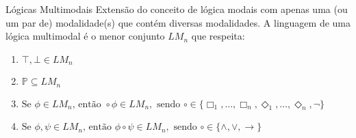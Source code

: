 \begin{frame}{Lógicas Multimodais}
    Extensão do conceito de lógica modais com apenas uma (ou um par de) modalidade(s) que contém diversas modalidades.
    A linguagem de uma lógica multimodal é o menor conjunto \(LM_n\) que respeita:

    \vspace{\baselineskip}

    \begin{enumerate}
        \item \(\top, \bot \in LM_n \)
        \item \(\mathbb{P} \subseteq LM_n\)
        \item \(\text{Se } \phi \in LM_n \text{, então } \circ \phi \in LM_n, \text{ sendo } \circ \in \{\Box_1, \dots, \Box_n, \Diamond_1, \dots, \Diamond_n, \neg\}\)
        \item \(\text{Se } \phi, \psi \in LM_n \text{, então } \phi \circ \psi \in LM_n, \text{ sendo } \circ \in \{\land, \lor, \to\}\)
    \end{enumerate}


\end{frame}